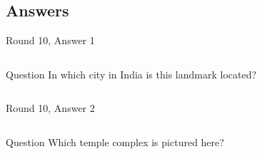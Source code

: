 \documentclass[11pt]{beamer}
\begin{document}
\subsection{Answers}

\begin{frame}[t]{Round 10, Answer 1}
\vspace{0.5em}
\begin{columns}[T,totalwidth=\linewidth]
\begin{column}{0.35\linewidth}
\begin{block}{Question}
In which city in India is this landmark located?
\end{block}
\end{column}
\begin{column}{0.6\linewidth}
\begin{center}
\texttt{[image: \{Images/tajmahal]}.jpg}
\end{center}
\end{column}
\end{columns}
\end{frame}
    

\begin{frame}[t]{Round 10, Answer 2}
\vspace{0.5em}
\begin{columns}[T,totalwidth=\linewidth]
\begin{column}{0.35\linewidth}
\begin{block}{Question}
Which temple complex is pictured here?
\end{block}
\end{column}
\begin{column}{0.6\linewidth}
\begin{center}
\texttt{[image: \{Images/angkor]}.jpg}
\end{center}
\end{column}
\end{columns}
\end{frame}
    
\end{document}
